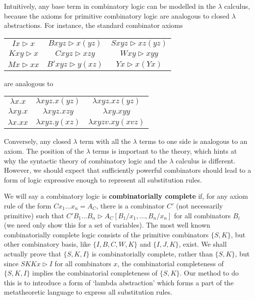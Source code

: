 Intuitively, any base term in combinatory logic can be modelled in the $\lambda$ calculus, because the axioms for primitive combinatory logic are analogous to closed $\lambda$ abstractions. For instance, the standard combinator axioms
%
\begin{center}
\begin{tabular}{ c c c }
 $Ix \rhd x$ & $Bxyz \rhd x(yz)$ & $Sxyz \rhd xz(yz)$ \\ 
 $Kxy \rhd x$ & $Cxyz \rhd xzy$ & $Wxy \rhd xyy$ \\  
 $Mx \rhd xx$ & $B'xyz \rhd y(xz)$ & $Yx \rhd x(Yx)$
\end{tabular}
\end{center}
%
are analogous to
%
\begin{center}
\begin{tabular}{ c c c }
 $\lambda x.x$ & $\lambda xyz.x(yz)$ & $\lambda xyz.xz(yz)$ \\ 
 $\lambda xy.x$ & $\lambda xyz.xzy$ & $\lambda xy.xyy$ \\  
 $\lambda x.xx$ & $\lambda xyz.y(xz)$ & $\lambda xyzv.xy(xvz)$
\end{tabular}
\end{center}
%
Conversely, any closed $\lambda$ term with all the $\lambda$ terms to one side is analogous to an axiom. The position of the $\lambda$ terms is important to the theory, which hints at why the syntactic theory of combinatory logic and the $\lambda$ calculus is different. However, we should expect that sufficiently powerful combinators should lead to a form of logic expressive enough to represent all substitution rules.

We will say a combinatory logic is {\bf combinatorially complete} if, for any axiom rule of the form $Cx_1 \dots x_n = A_C$, there is a combinator $C'$ (not necessarily primitive) such that $C'B_1 \dots B_n \rhd A_C[B_1/x_1, \dots, B_n/x_n]$ for all combinators $B_i$ (we need only show this for a set of variables). The most well known combinatorially complete logic consists of the primitive combinators $\{ S, K \}$, but other combinatory basis, like $\{ I,B,C,W,K \}$ and $\{ I,J,K \}$, exist. We shall actually prove that $\{ S, K, I \}$ is combinatorially complete, rather than $\{ S, K \}$, but since $SKKx \rhd I$ for all combinators $x$, the combinatorial completeness of $\{ S, K, I \}$ implies the combinatorial completeness of $\{ S, K \}$. Our method to do this is to introduce a form of `lambda abstraction' which forms a part of the metatheoretic language to express all substitution rules.

